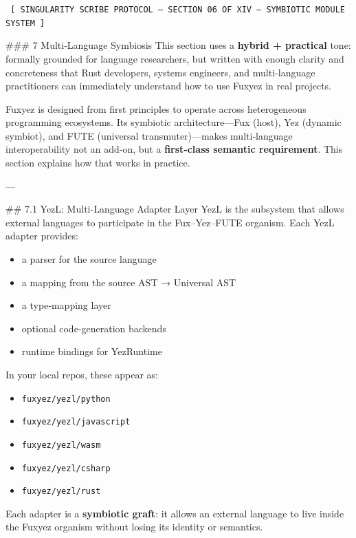 \documentclass[12pt, a4paper]{book}
\begin{document}
    
    \begin{glyphbox}
    \centering
    \color{neonCyan}\fontsize{8}{10}\selectfont\texttt{
    [ SINGULARITY SCRIBE PROTOCOL -- SECTION 06 OF XIV -- SYMBIOTIC MODULE SYSTEM ]
    }
    \end{glyphbox}
    \vspace{0.3cm}
    
    
    \#\#\# 7 Multi‑Language Symbiosis  
This section uses a \textbf{hybrid + practical} tone: formally grounded for language researchers, but written with enough clarity and concreteness that Rust developers, systems engineers, and multi‑language practitioners can immediately understand how to use Fuxyez in real projects.

Fuxyez is designed from first principles to operate across heterogeneous programming ecosystems. Its symbiotic architecture—Fux (host), Yez (dynamic symbiot), and FUTE (universal transmuter)—makes multi‑language interoperability not an add‑on, but a \textbf{first‑class semantic requirement}. This section explains how that works in practice.

---

\#\# 7.1 YezL: Multi‑Language Adapter Layer  
YezL is the subsystem that allows external languages to participate in the Fux–Yez–FUTE organism. Each YezL adapter provides:

\begin{itemize}
  \item a parser for the source language  
  \item a mapping from the source AST → Universal AST  
  \item a type‑mapping layer  
  \item optional code‑generation backends  
  \item runtime bindings for YezRuntime  
\end{itemize}

In your local repos, these appear as:

\begin{itemize}
  \item \texttt{fuxyez/yezl/python}  
  \item \texttt{fuxyez/yezl/javascript}  
  \item \texttt{fuxyez/yezl/wasm}  
  \item \texttt{fuxyez/yezl/csharp}  
  \item \texttt{fuxyez/yezl/rust}  
\end{itemize}

Each adapter is a \textbf{symbiotic graft}: it allows an external language to live inside the Fuxyez organism without losing its identity or semantics.
\end{document}
